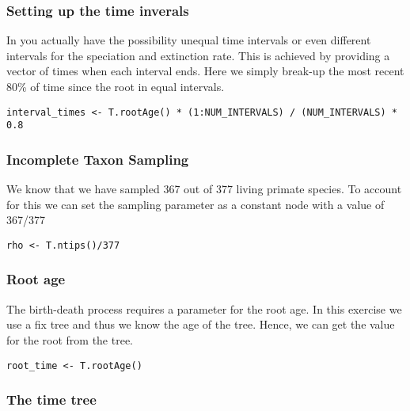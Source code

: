 \subsubsection{Setting up the time inverals}
In \RevBayes you actually have the possibility unequal time intervals or even different intervals for the speciation and extinction rate.
This is achieved by providing a vector of times when each interval ends.
Here we simply break-up the most recent 80\% of time since the root in equal intervals.
{\tt \begin{snugshade*}
\begin{lstlisting}
interval_times <- T.rootAge() * (1:NUM_INTERVALS) / (NUM_INTERVALS) * 0.8
\end{lstlisting}
\end{snugshade*}}


\subsubsection{Incomplete Taxon Sampling}

We know that we have sampled 367 out of 377 living primate species. 
To account for this we can set the sampling parameter as a constant node with a value of 367/377
{\tt \begin{snugshade*}
\begin{lstlisting}
rho <- T.ntips()/377
\end{lstlisting}
\end{snugshade*}}


\subsubsection{Root age}

The birth-death process requires a parameter for the root age.
In this exercise we use a fix tree and thus we know the age of the tree.
Hence, we can get the value for the root from the \citet{Springer2012} tree.
{\tt \begin{snugshade*}
\begin{lstlisting}
root_time <- T.rootAge()
\end{lstlisting}
\end{snugshade*}}

\subsubsection{The time tree}

